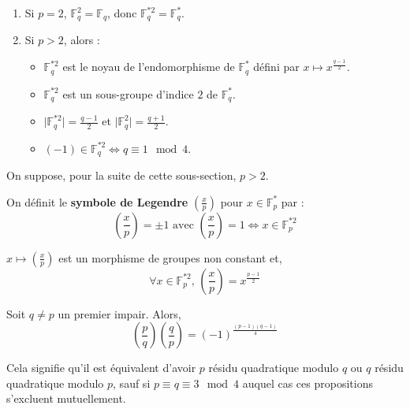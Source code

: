   \begin{proposition}
    \begin{enumerate}[label={\bfseries(\roman*)}]
      \item Si $p = 2$, $\mathbb{F}_q^2 = \mathbb{F}_q$, donc $\mathbb{F}_q^{*2} = \mathbb{F}_q^*$.
      \item Si $p > 2$, alors :
      \begin{itemize}
        \item $\mathbb{F}_q^{*2}$ est le noyau de l'endomorphisme de $\mathbb{F}_q^*$ défini par $x \mapsto x^{\frac{q-1}{2}}$.
        \item $\mathbb{F}_q^{*2}$ est un sous-groupe d'indice $2$ de $\mathbb{F}_q^*$.
        \item $\vert \mathbb{F}_q^{*2} \vert = \frac{q-1}{2}$ et $\vert \mathbb{F}_q^2 \vert = \frac{q+1}{2}$.
        \item $(-1) \in \mathbb{F}_q^{*2} \iff q \equiv 1 \mod 4$.
      \end{itemize}
    \end{enumerate}
  \end{proposition}


  On suppose, pour la suite de cette sous-section, $p > 2$.

  \begin{definition}
    On définit le \textbf{symbole de Legendre} $\left( \frac{x}{p} \right)$ pour $x \in \mathbb{F}_p^*$ par :
    \[ \left( \frac{x}{p} \right) = \pm 1 \text{ avec } \left( \frac{x}{p} \right) = 1 \iff x \in \mathbb{F}_p^{*2} \]
  \end{definition}

  \begin{proposition}
    $x \mapsto \left( \frac{x}{p} \right)$ est un morphisme de groupes non constant et,
    \[ \forall x \in \mathbb{F}_p^{*2}, \, \left( \frac{x}{p} \right) = x^{\frac{p-1}{2}} \]
  \end{proposition}

  \begin{theorem}
    Soit $q \neq p$ un premier impair. Alors,
    \[ \left( \frac{p}{q} \right) \left( \frac{q}{p} \right) = (-1)^{\frac{(p-1)(q-1)}{4}} \]
  \end{theorem}

  \begin{remark}
    Cela signifie qu'il est équivalent d'avoir $p$ résidu quadratique modulo $q$ ou $q$ résidu quadratique modulo $p$, sauf si $p \equiv q \equiv 3 \mod 4$ auquel cas ces propositions s'excluent mutuellement.
  \end{remark}

